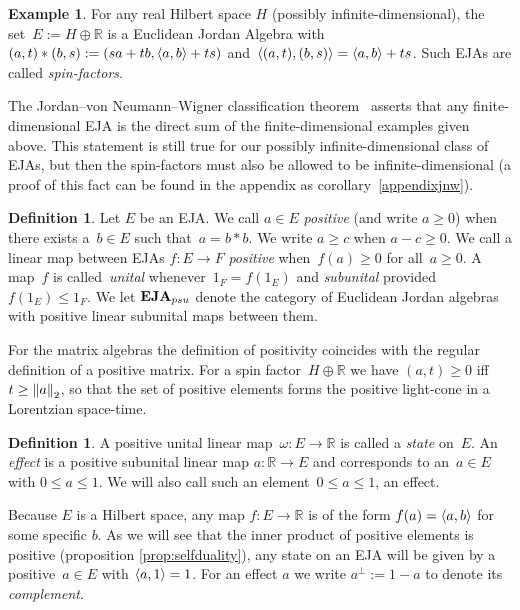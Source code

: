 \documentclass[submission,copyright,creativecommons]{eptcs}
\newcounter{main}
\theoremstyle{definition}
\newtheorem{definition}[main]{Definition}
\newtheorem{example}[main]{Example}
\DeclarePairedDelimiter{\inn}{\langle}{\rangle}
\newcommand{\EJA}{\text{\textbf{EJA}}\xspace}
\newcommand\R{\mathbb{R}}
\begin{document}
\begin{example}
For any real Hilbert space $H$ (possibly infinite-dimensional),
    the set~$E:=H\oplus \R$
    is a Euclidean Jordan Algebra
    with~$(a,t)*(b,s):= (sa+tb, \inn{a,b}+ts)$
    and~$\inn{(a,t),(b,s)} = \inn{a,b}+ts$.
    Such EJAs are called \emph{spin-factors}.
\end{example}

The Jordan--von Neumann--Wigner classification theorem~\cite{jordan1993algebraic}
asserts that any finite-dimensional EJA is the direct sum of the
finite-dimensional examples given above. This statement is still
true for our possibly infinite-dimensional class of EJAs, but then
the spin-factors must also be allowed to be infinite-dimensional
(a proof of this fact can be found in the appendix as
corollary~\ref{appendixjnw}).

\begin{definition}
    Let $E$ be an EJA. We call $a\in E$ \emph{positive}
    (and write $a\geq 0$) when there exists a~$b\in E$
    such that~$a=b*b$. We write $a\geq c$ when $a-c\geq 0$.
    We call a linear map between EJAs $f\colon E\rightarrow F$ \emph{positive}
    when~$f(a) \geq 0$ for all~$a \geq 0$.
    A map~$f$ is called~\emph{unital} whenever~$1_F=f(1_E)$ and
    \emph{subunital} provided~$f(1_E)\leq 1_F$.
	We let $\EJA_{psu}$ denote the category of Euclidean Jordan
	algebras with positive linear subunital maps between them.
\end{definition}

For the matrix algebras the definition of positivity coincides with
the regular definition of a positive matrix. For a spin
factor~$H\oplus \R$ we have $(a,t)\geq 0$ iff $t\geq \norm{a}_2$, so that
the set of positive elements forms the positive light-cone in a
Lorentzian space-time.

\begin{definition}
    A positive unital linear  map~$\omega\colon E\rightarrow \R$
        is called a \emph{state} on~$E$.
        An \emph{effect} is a positive
	subunital linear map $a\colon \R\rightarrow E$ and corresponds
        to an~$a\in E$ with $0\leq a\leq 1$.
    We will also call such an element~$0 \leq a \leq 1$, an effect.
\end{definition}
Because $E$ is a Hilbert space, any map $f:E\rightarrow \R$ is of
the form $f(a)=\inn{a,b}$ for some specific $b$. As we will see
that the inner product of positive elements is positive
(proposition \ref{prop:selfduality}),
any state
on an EJA will be given by a positive~$a\in E$ with $\inn{a,1}=1$.
For an effect $a$ we write $a^\perp:= 1-a$ to denote its
\emph{complement}.
\end{document}
